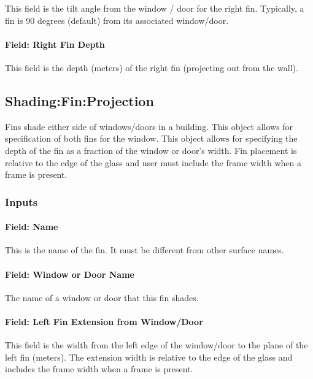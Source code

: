 This field is the tilt angle from the window / door for the right fin. Typically, a fin is 90 degrees (default) from its associated window/door.

\paragraph{Field: Right Fin Depth}\label{field-right-fin-depth}

This field is the depth (meters) of the right fin (projecting out from the wall).

\subsection{Shading:Fin:Projection}\label{shadingfinprojection}

Fins shade either side of windows/doors in a building. This object allows for specification of both fins for the window. This object allows for specifying the depth of the fin as a fraction of the window or door's width. Fin placement is relative to the edge of the glass and user must include the frame width when a frame is present.

\subsubsection{Inputs}\label{inputs-29-002}

\paragraph{Field: Name}\label{field-name-27-003}

This is the name of the fin. It must be different from other surface names.

\paragraph{Field: Window or Door Name}\label{field-window-or-door-name-3}

The name of a window or door that this fin shades.

\paragraph{Field: Left Fin Extension from Window/Door}\label{field-left-fin-extension-from-windowdoor-1}

This field is the width from the left edge of the window/door to the plane of the left fin (meters). The extension width is relative to the edge of the glass and includes the frame width when a frame is present.

